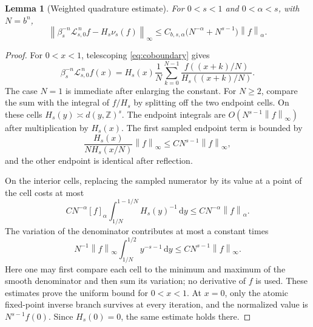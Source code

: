 \documentclass[11pt,a4paper]{article}
\numberwithin{equation}{section}
\newtheorem{lemma}[lemma]{Lemma}
\theoremstyle{definition}
\theoremstyle{remark}
\newcommand{\dd}{\,\mathrm d}
\newcommand{\Lop}{\mathcal L}
\newcommand{\norm}[1]{\left\lVert#1\right\rVert}
\begin{document}
\begin{lemma}[Weighted quadrature estimate]
\label{lem:quadrature}
For $0<s<1$ and $0<\alpha<s$, with $N=b^n$,
\begin{equation}
 \left\|\beta_s^{-n}\Lop_{s,0}^{\,n}f
                  -H_s\nu_s(f)\right\|_\infty
 \leq C_{b,s,\alpha}
       \bigl(N^{-\alpha}+N^{s-1}\bigr)\norm f_\alpha.
 \label{eq:quadrature}
\end{equation}
\end{lemma}
\begin{proof}
For $0<x<1$, telescoping \cref{eq:coboundary} gives
\begin{equation}
 \beta_s^{-n}\Lop_{s,0}^{\,n}f(x)
 =H_s(x)\frac1N\sum_{k=0}^{N-1}
       \frac{f((x+k)/N)}{H_s((x+k)/N)}.
 \label{eq:riemann}
\end{equation}
The case $N=1$ is immediate after enlarging the constant. For $N\geq2$,
compare the sum with the integral of $f/H_s$ by splitting off the two
endpoint cells. On these cells $H_s(y)\asymp d(y,\mathbb Z)^s$.
The endpoint integrals are $O(N^{s-1}\norm f_\infty)$ after multiplication
by $H_s(x)$. The first sampled endpoint term is bounded by
\[
 \frac{H_s(x)}{N H_s(x/N)}\norm f_\infty
 \leq C N^{s-1}\norm f_\infty,
\]
and the other endpoint is identical after reflection.

On the interior cells, replacing the sampled numerator by its value at
a point of the cell costs at most
\[
 C N^{-\alpha}[f]_\alpha\int_{1/N}^{1-1/N}H_s(y)^{-1}\dd y
 \leq C N^{-\alpha}\norm f_\alpha.
\]
The variation of the denominator contributes at most a constant times
\[
 N^{-1}\norm f_\infty\int_{1/N}^{1/2}y^{-s-1}\dd y
 \leq C N^{s-1}\norm f_\infty.
\]
Here one may first compare each cell to the minimum and maximum of the
smooth denominator and then sum its variation; no derivative of $f$ is
used. These estimates prove the uniform bound for $0<x<1$.
At $x=0$, only the atomic fixed-point inverse branch survives at every
iteration, and the normalized value is $N^{s-1}f(0)$. Since $H_s(0)=0$,
the same estimate holds there.
\end{proof}
\end{document}

